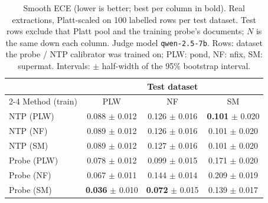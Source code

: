 \begin{table}[t]
\centering
\small
\caption{Smooth ECE (lower is better; best per column in bold). Real extractions, Platt-scaled on 100 labelled rows per test dataset. Test rows exclude that Platt pool and the training probe's documents; $N$ is the same down each column. Judge model \texttt{qwen-2.5-7b}. Rows: dataset the probe / NTP calibrator was trained on; PLW: pond, NF: nfix, SM: supermat. Intervals: $\pm$ half-width of the 95\% bootstrap interval.}
\label{tab:calibration-real-smece}
\begin{tabular}{lccc}
\toprule
& \multicolumn{3}{c}{Test dataset} \\
\cmidrule(l){2-4}
Method (train) & PLW & NF & SM \\
\midrule
NTP (PLW) & 0.088 $\pm$ 0.012 & 0.126 $\pm$ 0.016 & \textbf{0.101} $\pm$ 0.020 \\
NTP (NF) & 0.089 $\pm$ 0.012 & 0.126 $\pm$ 0.016 & 0.101 $\pm$ 0.020 \\
NTP (SM) & 0.089 $\pm$ 0.012 & 0.127 $\pm$ 0.016 & 0.101 $\pm$ 0.020 \\
\midrule
Probe (PLW) & 0.078 $\pm$ 0.012 & 0.099 $\pm$ 0.015 & 0.171 $\pm$ 0.020 \\
Probe (NF) & 0.067 $\pm$ 0.011 & 0.144 $\pm$ 0.014 & 0.209 $\pm$ 0.019 \\
Probe (SM) & \textbf{0.036} $\pm$ 0.010 & \textbf{0.072} $\pm$ 0.015 & 0.139 $\pm$ 0.017 \\
\bottomrule
\end{tabular}
\end{table}
